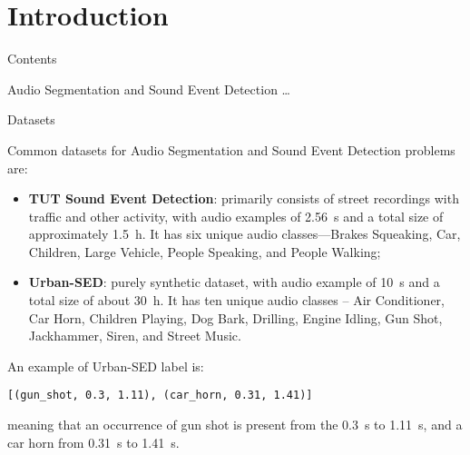

\section[Introduction]{Introduction}

	\begin{frame}{Contents}
			
		\tableofcontents
		
		\note{
			\dots			
		}		
		
	\end{frame}
	
	\begin{frame}{Audio Segmentation and Sound Event Detection}
		\dots		
		
		\note{
			\dots
		}
	\end{frame}
	
	\begin{frame}{Datasets}
	
		Common datasets for Audio Segmentation and Sound Event Detection problems are:
		
		\begin{itemize}
			\item \textbf{TUT Sound Event Detection}: primarily consists of street recordings with traffic and other activity, with audio examples of \SI{2.56}{\second} and a total size of approximately \SI{1.5}{\hour}. It has six unique audio classes—Brakes Squeaking, Car, Children, Large Vehicle, People Speaking, and People Walking;
			\item \textbf{Urban-SED}: purely synthetic dataset, with audio example of \SI{10}{\second} and a total size of about \SI{30}{\hour}. It has ten unique audio classes -- Air Conditioner, Car Horn, Children Playing, Dog Bark, Drilling, Engine Idling, Gun Shot, Jackhammer, Siren, and Street Music.
		\end{itemize}
		
		An example of Urban-SED label is:\\
		\centerline{\texttt{[(gun\_shot, 0.3, 1.11), (car\_horn, 0.31, 1.41)]}}
		meaning that an occurrence of gun shot is present from the \SI{0.3}{\second} to \SI{1.11}{\second}, and a car horn from \SI{0.31}{\second} to \SI{1.41}{\second}.
		
		\note{
			\dots
		}
	\end{frame}
	
